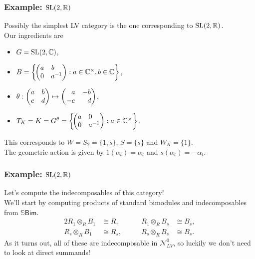 \documentclass{beamer}
\newcommand{\textcat}[1]{\mathrm{\textsf{#1}}}
\begin{document}
\begin{frame}
\frametitle{Example: $\textup{SL}(2, \mathbb{R})$}
Possibly the simplest LV category is the one corresponding to $\textup{SL}(2, \mathbb{R})$.\\[2ex]
Our ingredients are
\begin{itemize}
\item $G = \textup{SL}(2, \mathbb{C})$,
\item $B = \left\{\!\begin{pmatrix}a&b\hphantom{{}^{-1}}\\0&a^{-1}\end{pmatrix} : a \in \mathbb{C}^\times, b \in \mathbb{C}\right\}$,
\item $\theta : \begin{pmatrix}a&b\\c&d\end{pmatrix} \mapsto \begin{pmatrix}\hphantom{-}a&-b\\-c&\hphantom{-}d\end{pmatrix}$,
\item $T_K = K = G^\theta = \left\{\!\begin{pmatrix}a&0\hphantom{{}^{-1}}\\0&a^{-1}\end{pmatrix} : a \in \mathbb{C}^\times\right\}$.\\[2ex]
\end{itemize}
This corresponds to $W = S_2 = \{1, s\}$, $S = \{s\}$ and $W_K = \{1\}$.\\[2ex]
The geometric action is given by $1(\alpha_t) = \alpha_t$ and $s(\alpha_t) = -\alpha_t$.
\end{frame}

\begin{frame}
\frametitle{Example: $\textup{SL}(2, \mathbb{R})$}
Let's compute the indecomposables of this category!\\[2ex]

We'll start by computing products of standard bimodules and indecomposables from $\mathbb{S}\textcat{Bim}$.
\begin{alignat*}{2}
R_1 \otimes_R B_1 &\cong R,&\qquad R_1 \otimes_R B_{s} &\cong B_{s},\\
R_{s} \otimes_R B_1 &\cong R_{s},&\qquad R_{s} \otimes_R B_{s} &\cong B_{s}.
\end{alignat*}
As it turns out, all of these are indecomposable in $\mathcal{N}_{LV}^0$, so luckily we don't need to look at direct summands!
\end{frame}
\end{document}
